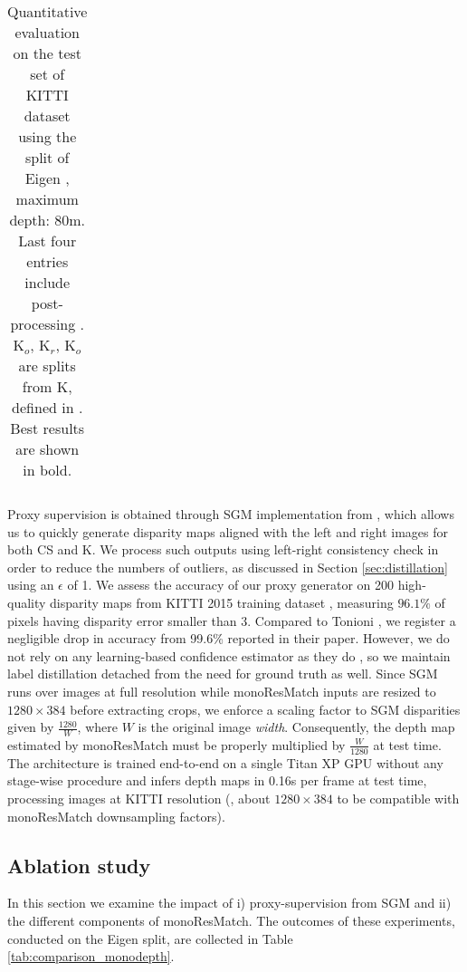 \documentclass[10pt,twocolumn,letterpaper]{article}
\begin{document}
\begin{table*}[!htbp]
{\begin{tabular}{l|c|c|cccc|ccc}
\hline
\end{tabular}
}
\smallskip
\caption{Quantitative evaluation on the test set of KITTI dataset \cite{KITTI_RAW} using the split of Eigen \etal \cite{eigen2014depth}, maximum depth: 80m. Last four entries include post-processing \cite{monodepth17}. K$_o$, K$_{r}$, K$_{o}$ are splits from K, defined in \cite{yang2018deep}. Best results are shown in bold. }
\label{table:eigen}
\end{table*} Proxy supervision is obtained through SGM implementation from \cite{spangenberg2014large}, which allows us to quickly generate disparity maps aligned with the left and right images for both CS and K. We process such outputs using left-right consistency check in order to reduce the numbers of outliers, as discussed in Section \ref{sec:distillation} using an $\epsilon$ of 1. We assess the accuracy of our proxy generator on 200 high-quality disparity maps from KITTI 2015 training dataset \cite{KITTI_2015}, measuring $96.1\%$ of pixels having disparity error smaller than 3. Compared to Tonioni \etal \cite{Tonioni_2017_ICCV}, we register a negligible drop in accuracy from 99.6\% reported in their paper. However, we do not rely on any learning-based confidence estimator as they do \cite{Poggi_2016_BMVC}, so we maintain label distillation detached from the need for ground truth as well.
Since SGM runs over images at full resolution while monoResMatch inputs are resized to $1280 \times 384$ before extracting crops, we enforce a scaling factor to SGM disparities given by $\frac{1280}{W}$, where $W$ is the original image \textit{width}. Consequently, the depth map estimated by monoResMatch must be properly multiplied by $\frac{W}{1280}$ at test time.  
The architecture is trained end-to-end on a single Titan XP GPU without any stage-wise procedure and infers depth maps in 0.16s per frame at test time, processing images at KITTI resolution (\ie, about $1280\times384$ to be compatible with monoResMatch downsampling factors).

\subsection{Ablation study}
In this section we examine the impact of i) proxy-supervision from SGM and ii) the different components of monoResMatch. The outcomes of these experiments, conducted on the Eigen split, are collected in Table \ref{tab:comparison_monodepth}. 
\end{document}

